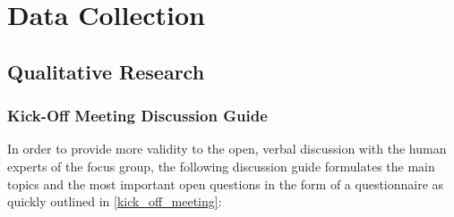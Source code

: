 \documentclass[draft,final]{thesisclass} %
\begin{document}
\section{Data Collection}

\subsection{Qualitative Research}

\subsubsection{Kick-Off Meeting Discussion Guide}
In order to provide more validity to the open, verbal discussion with the human experts of the focus group, the following discussion guide formulates the main topics and the most important open questions in the form of a questionnaire as quickly outlined in \ref{kick_off_meeting}:
\end{document}
